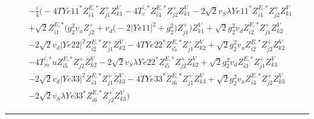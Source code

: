 \begin{align} 
 &-\frac{i}{4} \Big(-4 TYe11^* Z^{E,*}_{i 4} Z_{{j 1}}^{+} Z_{{k 1}}^{V} -4 T^{{\prime},*}_e Z^{E,*}_{i 4} Z_{{j 2}}^{+} Z_{{k 1}}^{V} -2 \sqrt{2} v_S \lambda Ye11^* Z^{E,*}_{i 4} Z_{{j 2}}^{+} Z_{{k 1}}^{V} \nonumber \\ 
 &+\sqrt{2} Z^{E,*}_{i 1} \Big(g_{2}^{2} v_u Z_{{j 2}}^{+}  + v_d \Big(-2 |Ye11|^2  + g_{2}^{2}\Big)Z_{{j 1}}^{+} \Big)Z_{{k 1}}^{V} +\sqrt{2} g_{2}^{2} v_d Z^{E,*}_{i 2} Z_{{j 1}}^{+} Z_{{k 2}}^{V} \nonumber \\ 
 &-2 \sqrt{2} v_d |Ye22|^2 Z^{E,*}_{i 2} Z_{{j 1}}^{+} Z_{{k 2}}^{V} -4 TYe22^* Z^{E,*}_{i 5} Z_{{j 1}}^{+} Z_{{k 2}}^{V} +\sqrt{2} g_{2}^{2} v_u Z^{E,*}_{i 2} Z_{{j 2}}^{+} Z_{{k 2}}^{V} \nonumber \\ 
 &-4 T^{{\prime},*}_mu Z^{E,*}_{i 5} Z_{{j 2}}^{+} Z_{{k 2}}^{V} -2 \sqrt{2} v_S \lambda Ye22^* Z^{E,*}_{i 5} Z_{{j 2}}^{+} Z_{{k 2}}^{V} +\sqrt{2} g_{2}^{2} v_d Z^{E,*}_{i 3} Z_{{j 1}}^{+} Z_{{k 3}}^{V} \nonumber \\ 
 &-2 \sqrt{2} v_d |Ye33|^2 Z^{E,*}_{i 3} Z_{{j 1}}^{+} Z_{{k 3}}^{V} -4 TYe33^* Z^{E,*}_{i 6} Z_{{j 1}}^{+} Z_{{k 3}}^{V} +\sqrt{2} g_{2}^{2} v_u Z^{E,*}_{i 3} Z_{{j 2}}^{+} Z_{{k 3}}^{V} \nonumber \\ 
 &-2 \sqrt{2} v_S \lambda Ye33^* Z^{E,*}_{i 6} Z_{{j 2}}^{+} Z_{{k 3}}^{V} \Big)\end{align} 
\hrule 
